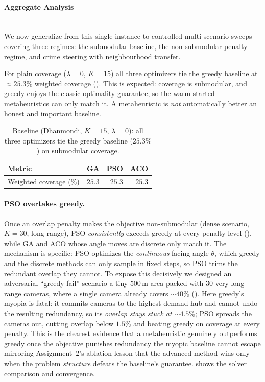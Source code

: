 \documentclass{ai-lab-report}
\begin{document}
\paragraph{Aggregate Analysis}
\mbox{}\\
 We now generalize from this single instance to controlled multi-scenario sweeps covering three regimes: the submodular baseline, the non-submodular penalty regime, and crime steering with neighbourhood transfer.

For plain coverage ($\lambda=0$, $K=15$) all three optimizers tie the greedy baseline at $\approx25.3\%$ weighted coverage (). This is expected: coverage is submodular, and greedy enjoys the classic optimality guarantee, so the warm-started metaheuristics can only match it. A metaheuristic is \emph{not} automatically better an honest and important baseline.

\begin{table}[H]
\centering
\small
\begin{tabularx}{\linewidth}{@{}Xrrr@{}}
\toprule
Metric & GA & PSO & ACO \\
\midrule
Weighted coverage (\%) & $25.3$ & $25.3$ & $25.3$ \\
\bottomrule
\end{tabularx}
\caption{Baseline (Dhanmondi, $K{=}15$, $\lambda{=}0$): all three optimizers tie the greedy baseline ($25.3\%$) on submodular coverage.}
\label{tab:a3baseline}
\end{table}

\paragraph{PSO overtakes greedy.}
Once an overlap penalty makes the objective non-submodular (dense scenario, $K=30$, long range), PSO \emph{consistently} exceeds greedy at every penalty level (), while GA and ACO whose angle moves are discrete only match it. The mechanism is specific: PSO optimizes the \emph{continuous} facing angle $\theta$, which greedy and the discrete methods can only sample in fixed steps, so PSO trims the redundant overlap they cannot. To expose this decisively we designed an adversarial ``greedy-fail'' scenario a tiny $500$\,m area packed with $30$ very-long-range cameras, where a single camera already covers ${\sim}40\%$ (). Here greedy's myopia is fatal: it commits cameras to the highest-demand hub and cannot undo the resulting redundancy, so its \emph{overlap stays stuck at ${\sim}4.5\%$}; PSO spreads the cameras out, cutting overlap below $1.5\%$ and beating greedy on coverage at every penalty. This is the clearest evidence that a metaheuristic genuinely outperforms greedy once the objective punishes redundancy the myopic baseline cannot escape mirroring Assignment~2's ablation lesson that the advanced method wins only when the problem \emph{structure} defeats the baseline's guarantee.  shows the solver comparison and convergence.
\end{document}
